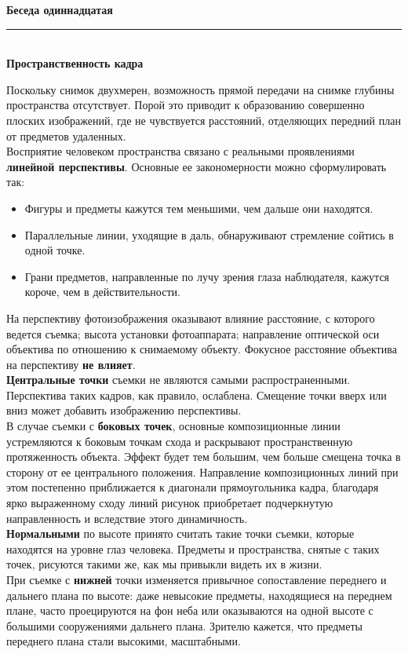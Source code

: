 \documentclass{article}
\newcommand{\important}[1]{\textbf{#1}}
\renewcommand{\section}[2]{
	\vspace{6em}
	\begin{flushright}
		\Large
		\baselineskip=0.5\baselineskip
		\textbf{#1}
		\\
		\rule[0.5\baselineskip]{\textwidth}{0.15pt}
		\\
		\textbf{#2}
	\end{flushright}
}
\begin{document}
\section{Беседа одиннадцатая}{Пространственность кадра}
Поскольку снимок двухмерен, возможность прямой передачи на снимке глубины пространства отсутствует. Порой это приводит к образованию совершенно плоских изображений, где не чувствуется расстояний, отделяющих передний план от предметов удаленных.\\
Восприятие человеком пространства связано с реальными проявлениями \important{линейной перспективы}. Основные ее закономерности можно сформулировать так:
\begin{itemize}
	\item Фигуры и предметы кажутся тем меньшими, чем дальше они находятся.
	\item Параллельные линии, уходящие в даль, обнаруживают стремление сойтись в одной точке.
	\item Грани предметов, направленные по лучу зрения глаза наблюдателя, кажутся короче, чем в действительности.
\end{itemize}
На перспективу фотоизображения оказывают влияние расстояние, с которого ведется съемка; высота установки фотоаппарата; направление оптической оси объектива по отношению к снимаемому объекту. Фокусное расстояние объектива на перспективу \important{не влияет}.\\
\important{Центральные точки} съемки не являются самыми распространенными. Перспектива таких кадров, как правило, ослаблена. Смещение точки вверх или вниз может добавить изображению перспективы.\\
В случае съемки с \important{боковых точек}, основные композиционные линии устремляются к боковым точкам схода и раскрывают пространственную протяженность объекта. Эффект будет тем большим, чем больше смещена точка в сторону от ее центрального положения. Направление композиционных линий при этом постепенно приближается к диагонали прямоугольника кадра, благодаря ярко выраженному сходу линий рисунок приобретает подчеркнутую направленность и вследствие этого динамичность.\\
\important{Нормальными} по высоте принято считать такие точки съемки, которые находятся на уровне глаз человека. Предметы и пространства, снятые с таких точек, рисуются такими же, как мы привыкли видеть их в жизни.\\
При съемке с \important{нижней} точки изменяется привычное сопоставление переднего и дальнего плана по высоте: даже невысокие предметы, находящиеся на переднем плане, часто проецируются на фон неба или оказываются на одной высоте с большими сооружениями дальнего плана. Зрителю кажется, что предметы переднего плана стали высокими, масштабными.\\
\end{document}
